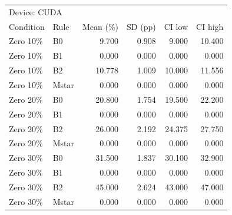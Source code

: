 \begin{tabular}{llrrrr}
\toprule
\multicolumn{6}{l}{Device: CUDA} \\
Condition & Rule & Mean (\%) & SD (pp) & CI low & CI high \\
\midrule
Zero 10\% & B0 & 9.700 & 0.908 & 9.000 & 10.400 \\
Zero 10\% & B1 & 0.000 & 0.000 & 0.000 & 0.000 \\
Zero 10\% & B2 & 10.778 & 1.009 & 10.000 & 11.556 \\
Zero 10\% & Mstar & 0.000 & 0.000 & 0.000 & 0.000 \\
Zero 20\% & B0 & 20.800 & 1.754 & 19.500 & 22.200 \\
Zero 20\% & B1 & 0.000 & 0.000 & 0.000 & 0.000 \\
Zero 20\% & B2 & 26.000 & 2.192 & 24.375 & 27.750 \\
Zero 20\% & Mstar & 0.000 & 0.000 & 0.000 & 0.000 \\
Zero 30\% & B0 & 31.500 & 1.837 & 30.100 & 32.900 \\
Zero 30\% & B1 & 0.000 & 0.000 & 0.000 & 0.000 \\
Zero 30\% & B2 & 45.000 & 2.624 & 43.000 & 47.000 \\
Zero 30\% & Mstar & 0.000 & 0.000 & 0.000 & 0.000 \\
\bottomrule
\end{tabular}
